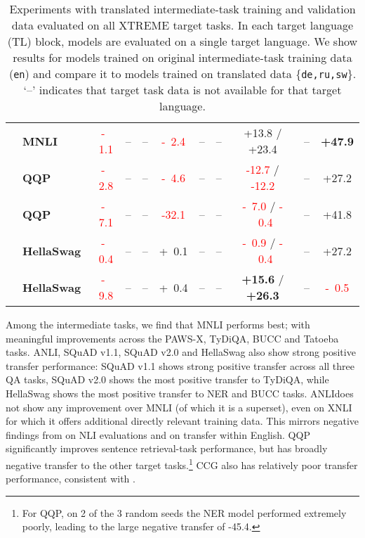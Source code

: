 \documentclass[11pt,a4paper]{article}
\newcommand{\anli}{ANLI}
\newcommand{\green}[1]{\textcolor{OliveGreen}{#1}}
\newcommand{\red}[1]{\textcolor{red}{#1}}
\begin{document}
\begin{table*}[t!]
{\begin{tabular}{ll ccccccccc}
& \bf MNLI &   \red{-\ 1.1}   &   --   &   --   &   \red{-\ 2.4}   &   --   &   --   &   \green{+13.8} / \green{+23.4}   &   --   &   \green{\bf +47.9}  \\
& \bf QQP &   \red{-\ 2.8}   &   --   &   --   &   \red{-\ 4.6}   &   --   &   --   &   \red{-12.7} / \red{-12.2}   &   --   &   \green{+27.2}  \\
& \bf QQP &   \red{-\ 7.1}   &   --   &   --   &   \red{-32.1}   &   --   &   --   &   \red{-\ 7.0} / \red{-\ 0.4}   &   --   &   \green{+41.8}  \\
& \bf HellaSwag &   \red{-\ 0.4}   &   --   &   --   &   \green{+\ 0.1}   &   --   &   --   &   \red{-\ 0.9} / \red{-\ 0.4}   &   --   &   \green{+27.2}  \\
& \bf HellaSwag &   \red{-\ 9.8}   &   --   &   --   &   \green{+\ 0.4}   &   --   &   --   &   \green{\bf +15.6} / \green{\bf +26.3}   &   --   &   \red{-\ 0.5}  \\
\bottomrule
\end{tabular}
}
\caption{Experiments with translated intermediate-task training and validation data evaluated on all XTREME target tasks.
In each target language (TL) block, models are evaluated on a single target language.
We show results for models trained on original intermediate-task training data (\texttt{en}) and compare it to models trained on translated data \{\texttt{de,ru,sw}\}. `--' indicates that target task data is not available for that target language.
}
\label{tab:translated_results_all_target_tasks}
\end{table*}

Among the intermediate tasks, we find that MNLI performs best; with meaningful improvements across the PAWS-X, TyDiQA, BUCC and Tatoeba tasks. \anli, SQuAD v1.1, SQuAD v2.0 and HellaSwag also show strong positive transfer performance: SQuAD v1.1 shows strong positive transfer across all three QA tasks, SQuAD v2.0 shows the most positive transfer to TyDiQA, while HellaSwag shows the most positive transfer to NER and BUCC tasks.
\anli does not show any improvement over MNLI (of which it is a superset), even on XNLI for which it offers additional directly relevant training data. This mirrors negative findings from \citet{nie2019adversarial} on NLI evaluations and \citet{bowman2020collecting} on transfer within English.
QQP significantly improves sentence retrieval-task performance, but has broadly negative transfer to the other target tasks.\footnote{For QQP, on 2 of the 3 random seeds the NER model performed extremely poorly, leading to the large negative transfer of -45.4.} CCG also has relatively poor transfer performance, consistent with \citet{pruksachatkun2020intermediate}.
\end{document}
